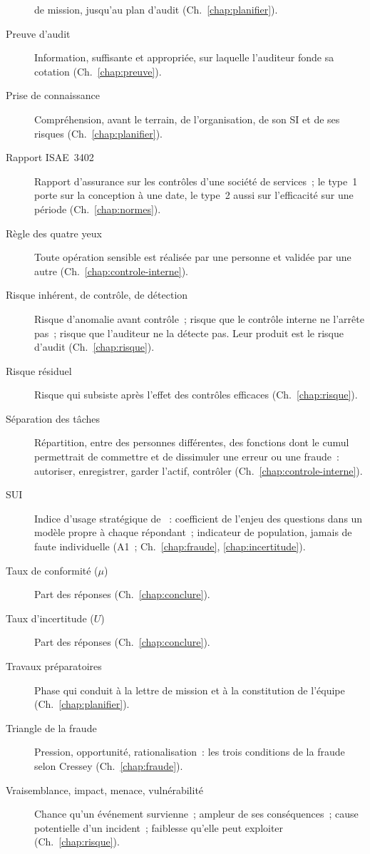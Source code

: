 \begin{description}
          de mission, jusqu'au plan d'audit (Ch.~\ref{chap:planifier}).
    \item[Preuve d'audit] Information, suffisante et appropriée, sur
          laquelle l'auditeur fonde sa cotation (Ch.~\ref{chap:preuve}).
    \item[Prise de connaissance] Compréhension, avant le terrain, de
          l'organisation, de son SI et de ses risques (Ch.~\ref{chap:planifier}).
    \item[Rapport ISAE~3402] Rapport d'assurance sur les contrôles d'une
          société de services~; le type~1 porte sur la conception à une
          date, le type~2 aussi sur l'efficacité sur une période
          (Ch.~\ref{chap:normes}).
    \item[Règle des quatre yeux] Toute opération sensible est réalisée par
          une personne et validée par une autre (Ch.~\ref{chap:controle-interne}).
    \item[Risque inhérent, de contrôle, de détection] Risque d'anomalie avant
          contrôle~; risque que le contrôle interne ne l'arrête pas~; risque
          que l'auditeur ne la détecte pas. Leur produit est le risque
          d'audit (Ch.~\ref{chap:risque}).
    \item[Risque résiduel] Risque qui subsiste après l'effet des contrôles
          efficaces (Ch.~\ref{chap:risque}).
    \item[Séparation des tâches] Répartition, entre des personnes
          différentes, des fonctions dont le cumul permettrait de commettre
          et de dissimuler une erreur ou une fraude~: autoriser,
          enregistrer, garder l'actif, contrôler
          (Ch.~\ref{chap:controle-interne}).
    \item[SUI] Indice d'usage stratégique de \NEK{}~: coefficient de l'enjeu
          des questions dans un modèle propre à chaque répondant~; indicateur
          de population, jamais de faute individuelle (A1~;
          Ch.~\ref{chap:fraude}, \ref{chap:incertitude}).
    \item[Taux de conformité ($\mu$)] Part des réponses \OUI{}
          (Ch.~\ref{chap:conclure}).
    \item[Taux d'incertitude ($U$)] Part des réponses \NEK{}
          (Ch.~\ref{chap:conclure}).
    \item[Travaux préparatoires] Phase qui conduit à la lettre de mission et
          à la constitution de l'équipe (Ch.~\ref{chap:planifier}).
    \item[Triangle de la fraude] Pression, opportunité, rationalisation~:
          les trois conditions de la fraude selon Cressey
          (Ch.~\ref{chap:fraude}).
    \item[Vraisemblance, impact, menace, vulnérabilité] Chance qu'un événement
          survienne~; ampleur de ses conséquences~; cause potentielle d'un
          incident~; faiblesse qu'elle peut exploiter (Ch.~\ref{chap:risque}).
\end{description}
